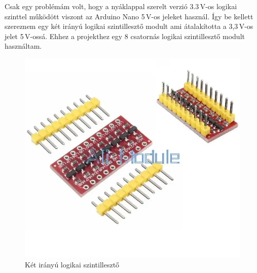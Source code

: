 \documentclass[]{thesis-ekf}
\theoremstyle{definition}
\theoremstyle{remark}
\begin{document}
	Csak egy problémám volt, hogy a nyáklappal szerelt verzió 3.3\,V-os logikai szinttel működött viszont az Arduino Nano 5\,V-os jeleket használ.\cite{adns9800_3} Így be kellett szereznem egy két irányú logikai szintillesztő\cite{szintilleszto} modult ami átalakította a 3,3\,V-os  jelet 5\,V-ossá. Ehhez a projekthez egy 8 csatornás logikai szintillesztő modult használtam.
	
	\begin{figure}[th!]
		\centering
		\includegraphics[width=0.4\linewidth]{szintilleszto}
		\caption[Logikai szintillesztő]{Két irányú logikai szintillesztő}
		\label{fig:szintilleszto}
	\end{figure}
\end{document}
